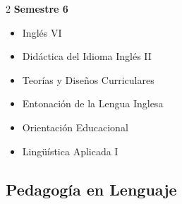 \documentclass[12pt,a4paper]{article}
\begin{document}
\begin{multicols}{2}
		\textbf{Semestre 6}
		\begin{itemize}
			\item Inglés VI
			\item Didáctica del Idioma Inglés II
			\item Teorías y Diseños Curriculares
			\item Entonación de la Lengua Inglesa
			\item Orientación Educacional
			\item Lingüística Aplicada I
		\end{itemize}
	\end{multicols}
	
	\newpage
	
	\subsection{Pedagogía en Lenguaje}
	
\end{document}
